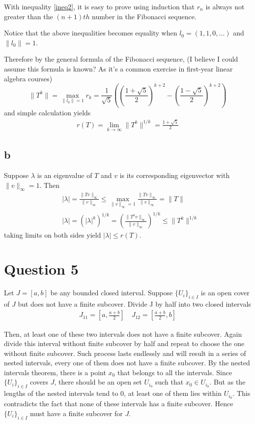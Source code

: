 \documentclass{article}
\begin{document}
With inequality \ref{ineq2}, it is easy to prove using induction that $r_n$ is always not greater than the $(n+1)th$ number in the Fibonacci sequence.

Notice that the above inequalities becomes equality when $l_0=(1,1,0,\dots)$ and $\lVert l_0\rVert=1$. 

Therefore by the general formula of the Fibonacci sequence, (I believe I could assume this formula is known? As it's a common exercise in first-year linear algebra courses)
$$\lVert T^k \rVert= \max_{\lVert l_0\rVert=1}r_k =\frac{1}{\sqrt{5}}((\frac{1+\sqrt{5}}{2} )^{k+2}-(\frac{1-\sqrt{5}}{2})^{k+2} )$$
and simple calculation yields
\begin{align*}
	r(T)=\lim_{k\to\infty} \lVert T^k\rVert^{1/k}=\frac{1+\sqrt{5}}{2}
\end{align*}

\subsection*{b}
Suppose $\lambda$ is an eigenvalue of $T$ and $v$ is its corresponding eigenvector with $\lVert v \rVert_\infty=1$. Then
\begin{align*}
	&|\lambda|=\frac{\lVert Tv\rVert_\infty}{\lVert v\rVert_\infty}\leq \max_{\lVert v\rVert_\infty=1}\frac{\lVert Tv\rVert_\infty}{\lVert v\rVert_\infty}=\lVert T\rVert \\
	&|\lambda |=(|\lambda|^k)^{1/k}=(\frac{\lVert T^k v\rVert_\infty}{\lVert v\rVert_\infty} )^{1/k}\leq \lVert T^k\rVert^{1/k}
\end{align*}
taking limits on both sides yield $|\lambda|\leq r(T)$.

\section*{Question 5}
Let $J=[a,b]$ be any bounded closed interval. Suppose $\{U_i\}_{i\in I}$ is an open cover of $J$ but does not have a finite subcover. Divide J by half into two closed intervals 
\begin{align*}
	J_{11}=[a,\frac{a+b}{2}] \quad  J_{12}=[\frac{a+b}{2},b]
\end{align*}

Then, at least one of these two intervals does not have a finite subcover. Again divide this interval without finite subcover by half and repeat to choose the one without finite subcover. Such process lasts endlessly and will result in a series of nested intervals, every one of them does not have a finite subcover. By the nested intervals theorem, there is a point $x_0$ that belongs to all the intervals. Since $\{U_i\}_{i\in I}$ covers $J$, there should be an open set $U_{i_0}$ such that $x_0\in U_{i_0}$. But as the lengths of the nested intervals tend to $0$, at least one of them lies within $U_{i_0}$. This contradicts the fact that none of these intervals has a finite subcover. Hence $\{U_{i}\}_{i\in I}$ must have a finite subcover for $J$.
\end{document}
